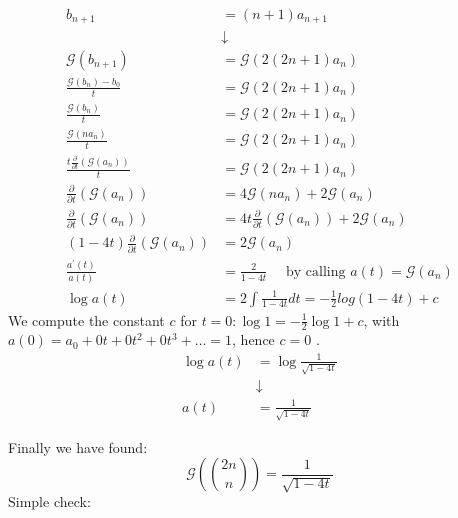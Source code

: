 \begin{displaymath}
  \begin{split}
    b_{n+1} &= (n+1)a_{n+1} \\
    &\downarrow \\
    \mathcal{G} (b_{n+1}) &= \mathcal{G} (2(2n+1)a_n)\\
    \frac{\mathcal{G} (b_n) - b_0}{t} &= \mathcal{G} (2(2n+1)a_n)\\
    \frac{\mathcal{G} (b_n)}{t} &= \mathcal{G} (2(2n+1)a_n)\\
    \frac{\mathcal{G} (n a_n)}{t} &= \mathcal{G} (2(2n+1)a_n)\\
    \frac{t\frac{\partial}{\partial t}\left( \mathcal{G} (a_n)
      \right) }{t} &= \mathcal{G} (2(2n+1)a_n)\\
    \frac{\partial}{\partial t}\left( \mathcal{G} (a_n) \right) &=
    4\mathcal{G} (n a_n) + 2\mathcal{G} (a_n)\\
    \frac{\partial}{\partial t}\left( \mathcal{G} (a_n) \right) &= 4 t
    \frac{\partial}{\partial t}\left(
      \mathcal{G} (a_n) \right) + 2\mathcal{G} (a_n)\\
    (1-4t)\frac{\partial}{\partial t}\left( \mathcal{G} (a_n) \right)
    &=    2\mathcal{G} (a_n) \\
    \frac{a^\prime(t)}{a(t)} &= \frac{2}{1-4t} \quad \text{ by calling
    }
    a(t) = \mathcal{G} (a_n)\\
    \log a(t) &= 2\int{ \frac{1}{1-4t}dt} = - \frac{1}{2} log{(1-4t)}
    + c
  \end{split}
\end{displaymath}
We compute the constant $c$ for $t=0: \log 1 = - \frac{1}{2} \log 1 +
c$, with $a(0) = a_0 + 0t+0t^2 + 0t^3+\ldots = 1$, hence $c=0$ .
\begin{displaymath}
  \begin{split}
    \log{a(t)} &= \log{\frac{1}{\sqrt{1-4t}}}\\
    &\downarrow \\
    a(t) &= \frac{1}{\sqrt{1-4t}}
  \end{split}
\end{displaymath}

Finally we have found:
\begin{equation}
  \label{eq:binomial-coefficient-gen-fun}
  \mathcal{G} \left({{2n}\choose{n}} \right) =
  \frac{1}{\sqrt{1-4t}}
\end{equation}
Simple check:


